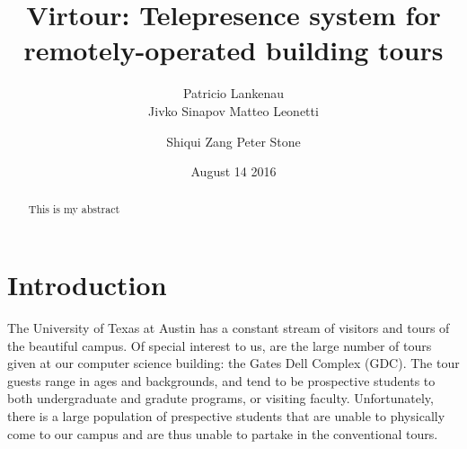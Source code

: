 \documentclass{sig-alternate-05-2015}
\begin{document}
\doi{}

\isbn{}



%

\title{Virtour: Telepresence system for remotely-operated building tours}

\author{
\alignauthor
Patricio Lankenau\\
\alignauthor
Jivko Sinapov
\alignauthor
Matteo Leonetti
\and 
\alignauthor
Shiqui Zang
\alignauthor
Peter Stone
}
\date{August 14 2016}

\maketitle
\begin{abstract}
  This is my abstract
\end{abstract}


\section{Introduction}

The University of Texas at Austin has a constant stream of visitors and tours
of the beautiful campus. Of special interest to us, are the large number of
tours given at our computer science building: the Gates Dell Complex (GDC). The
tour guests range in ages and backgrounds, and tend to be prospective students
to both undergraduate and gradute programs, or visiting faculty. Unfortunately,
there is a large population of prespective students that are unable to
physically come to our campus and are thus unable to partake in the
conventional tours.
\end{document}
